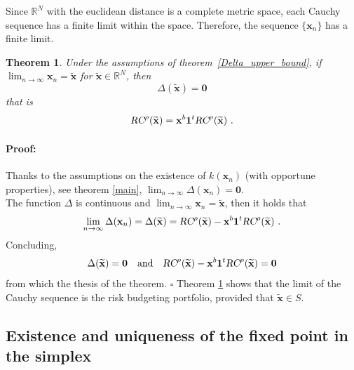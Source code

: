 \documentclass[preprint,11pt,authoryear]{elsarticle}
\newtheorem{theorem}{Theorem}%
\newenvironment{proof}{\paragraph{Proof:}}{\hfill$\square$}
\begin{document}
Since $\mathbb R^N$ with the euclidean distance is a complete metric space, each Cauchy sequence has a finite limit within the space. Therefore, the sequence $\{ \mathbf{x}_n\}$ has a finite limit.  
\begin{theorem}\label{fix}
Under the assumptions of theorem~\ref{Delta_upper_bound}, if $\lim_{n\rightarrow \infty} \mathbf{x}_n=\widetilde{ \mathbf{x}} $ for $\widetilde{\mathbf{x}}\in \mathbb R^N$, then 
$$ \Delta(\widetilde {\mathbf{x}})=\mathbf{0} $$
that is 
$$\textsl{RC}^{\rho}(\widetilde{ \mathbf{x}} )  = \mathbf{x}^b \textbf{1}^t \textsl{RC}^{\rho}(\widetilde{ \mathbf{x}} ) \ .$$
\end{theorem}
\begin{proof}
Thanks to the assumptions on the existence of $k(\mathbf{x}_n)$ (with opportune properties), see theorem \ref{main},   $\lim_{n\rightarrow \infty} \Delta( \mathbf{x}_n )=\mathbf{0}$. \\
The function $\Delta$ is continuous and $\lim_{n\rightarrow \infty} \mathbf{x}_n=\widetilde{ \mathbf{x}} $, then it holds that
$$ \lim_{n\rightarrow \infty} \Delta( \mathbf{x}_n)= \Delta (\widetilde{ \mathbf{x}} ) =  \textsl{RC}^{\rho}(\widetilde{ \mathbf{x}} )  - \mathbf{x}^b \textbf{1}^t \textsl{RC}^{\rho}(\widetilde{ \mathbf{x}} )  \ .$$
Concluding,  
$$\Delta(\widetilde {\mathbf{x}})=\mathbf{0}  \quad \textrm {and} \quad  \textsl{RC}^{\rho}(\widetilde{ \mathbf{x}} )  - \mathbf{x}^b \textbf{1}^t \textsl{RC}^{\rho}(\widetilde{ \mathbf{x}} )  =\mathbf 0 $$
from which the thesis of the theorem.
\end{proof}
Theorem \ref{fix} shows that the limit of the Cauchy sequence is the risk budgeting portfolio, provided that $\widetilde{ \mathbf{x}} \in S$.


\subsection{Existence and uniqueness of the fixed point in the simplex}\label{exuniq}
\end{document}
